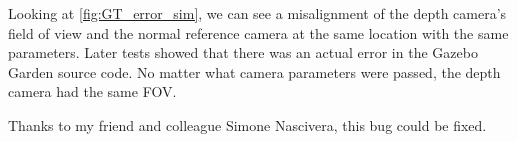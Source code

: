 Looking at \cref{fig:GT_error_sim}, we can see a misalignment of the depth camera's field of view and the normal reference camera at the same location with the same parameters. Later tests showed that there was an actual error in the Gazebo Garden source code. No matter what camera parameters were passed, the depth camera had the same FOV. 

Thanks to my friend and colleague Simone Nascivera, this bug could be fixed.